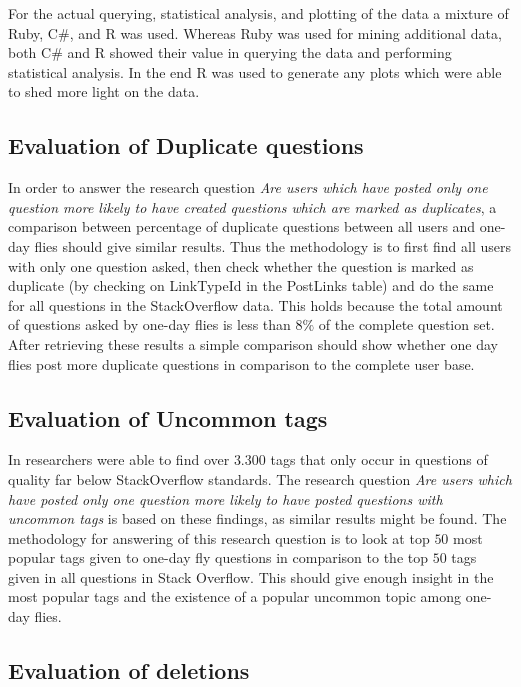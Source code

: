 \documentclass[conference]{IEEEtran}
\begin{document}
For the actual querying, statistical analysis, and plotting of the data a
mixture of Ruby, C\#, and R was used. Whereas Ruby was used for mining
additional data,  both C\# and R showed their value in querying the data and
performing statistical analysis. In the end R was used to generate any plots
which were able to shed more light on the data.


\subsection{Evaluation of Duplicate questions}
In order to answer the research question \textit{Are users which have posted
only one question more likely to have created questions which are marked as
duplicates}, a comparison between percentage of duplicate questions  between
all users and one-day flies should give similar results. Thus the methodology
is to first find all users with only one question asked, then check whether the
question is marked as duplicate (by checking on  LinkTypeId in the PostLinks
table) and do the same for all questions in the StackOverflow data. This holds
because the total amount of questions asked by one-day flies is less than $8\%$
of the complete question set. After retrieving these results a simple
comparison should show whether one day flies post more duplicate questions in
comparison to the complete user base.

\subsection{Evaluation of Uncommon tags}
In \cite{correa2014chaff} researchers were able to find over $3.300$ tags that
only occur in questions of quality far below StackOverflow standards. The
research question \textit{Are users which have posted only one question more
likely to have posted questions with uncommon tags} is based on these findings,
as similar results might be found. The methodology for answering of this
research question is to look at top $50$ most popular tags given to one-day fly
questions in comparison to the top $50$ tags given in all questions in Stack
Overflow. This should give enough insight in the most popular tags and the
existence of a popular uncommon topic among one-day flies.

\subsection{Evaluation of deletions}
\end{document}

